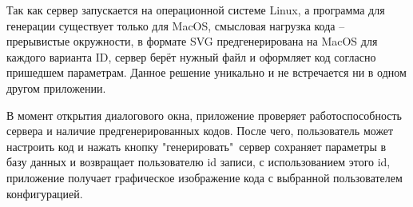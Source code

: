       Так как сервер запускается на операционной системе Linux, а программа для генерации существует только для MacOS, смысловая нагрузка кода -- прерывистые окружности, в формате SVG предгенерирована на MacOS для каждого варианта ID, сервер берёт нужный файл и оформляет код согласно пришедшем параметрам. Данное решение уникально и не встречается ни в одном другом приложении.


      В момент открытия диалогового окна, приложение проверяет работоспособность сервера и наличие предгенерированных кодов. После чего, пользователь может настроить код и нажать кнопку "генерировать"\, сервер сохраняет параметры в базу данных и возвращает пользователю id записи, с использованием этого id, приложение получает графическое изображение кода с выбранной пользователем конфигурацией.

